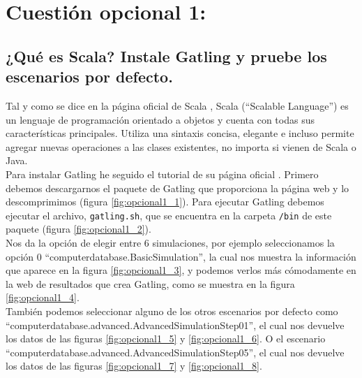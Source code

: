 
\section{Cuestión opcional 1:}

\subsection{¿Qué es Scala? Instale Gatling y pruebe los escenarios por defecto.}

Tal y como se dice en la página oficial de Scala \cite{Scala}, Scala (``Scalable Language'') es un lenguaje de programación orientado a objetos y cuenta con todas sus características principales. Utiliza una sintaxis concisa, elegante e incluso permite agregar nuevas operaciones a las clases existentes, no importa si vienen de Scala o Java.\\

Para instalar Gatling he seguido el tutorial de su página oficial \cite{Gatling}. Primero debemos descargarnos el paquete de Gatling que proporciona la página web y lo descomprimimos (figura \ref{fig:opcional1_1}). Para ejecutar Gatling debemos ejecutar el archivo, \texttt{gatling.sh}, que se encuentra en la carpeta \texttt{/bin} de este paquete (figura \ref{fig:opcional1_2}). \\

Nos da la opción de elegir entre 6 simulaciones, por ejemplo seleccionamos la opción 0 ``computerdatabase.BasicSimulation'', la cual nos muestra la información que aparece en la figura \ref{fig:opcional1_3}, y podemos verlos más cómodamente en la web de resultados que crea Gatling, como se muestra en la figura \ref{fig:opcional1_4}.\\

También podemos seleccionar alguno de los otros escenarios por defecto como ``computerdatabase.advanced.AdvancedSimulationStep01'', el cual nos devuelve los datos de las figuras \ref{fig:opcional1_5} y \ref{fig:opcional1_6}. O el escenario ``computerdatabase.advanced.AdvancedSimulationStep05'', el cual nos devuelve los datos de las figuras \ref{fig:opcional1_7} y \ref{fig:opcional1_8}.




